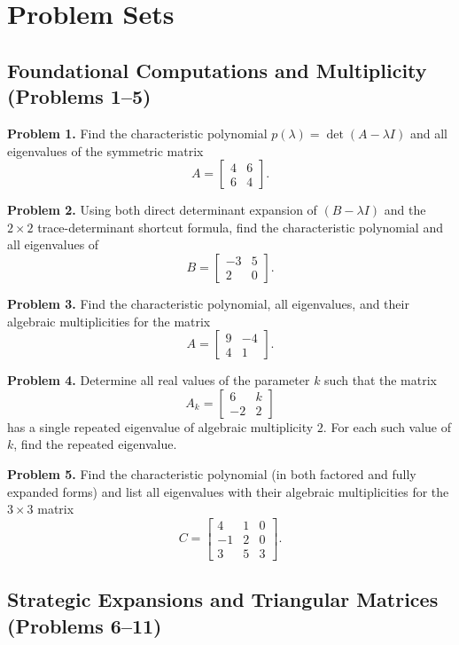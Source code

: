 \documentclass[11pt, letterpaper]{article}
\theoremstyle{definition}
\theoremstyle{remark}
\begin{document}
\newpage

\section{Problem Sets}

\subsection{Foundational Computations and Multiplicity (Problems 1--5)}

\noindent\textbf{Problem 1.} Find the characteristic polynomial $p(\lambda) = \det(A - \lambda I)$ and all eigenvalues of the symmetric matrix
\[
A = \begin{bmatrix} 4 & 6 \\ 6 & 4 \end{bmatrix}.
\]

\noindent\textbf{Problem 2.} Using both direct determinant expansion of $(B - \lambda I)$ and the $2 \times 2$ trace-determinant shortcut formula, find the characteristic polynomial and all eigenvalues of
\[
B = \begin{bmatrix} -3 & 5 \\ 2 & 0 \end{bmatrix}.
\]

\noindent\textbf{Problem 3.} Find the characteristic polynomial, all eigenvalues, and their algebraic multiplicities for the matrix
\[
A = \begin{bmatrix} 9 & -4 \\ 4 & 1 \end{bmatrix}.
\]

\noindent\textbf{Problem 4.} Determine all real values of the parameter $k$ such that the matrix
\[
A_k = \begin{bmatrix} 6 & k \\ -2 & 2 \end{bmatrix}
\]
has a single repeated eigenvalue of algebraic multiplicity $2$. For each such value of $k$, find the repeated eigenvalue.

\noindent\textbf{Problem 5.} Find the characteristic polynomial (in both factored and fully expanded forms) and list all eigenvalues with their algebraic multiplicities for the $3 \times 3$ matrix
\[
C = \begin{bmatrix} 4 & 1 & 0 \\ -1 & 2 & 0 \\ 3 & 5 & 3 \end{bmatrix}.
\]

\subsection{Strategic Expansions and Triangular Matrices (Problems 6--11)}
\end{document}
